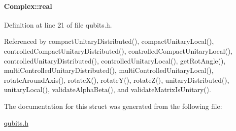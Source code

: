 \paragraph[{\texorpdfstring{real}{real}}]{ Complex\+::real}\hypertarget{structComplex_a479ad939835457595fcca3ca55c06283}{}\label{structComplex_a479ad939835457595fcca3ca55c06283}


Definition at line 21 of file qubits.\+h.



Referenced by compact\+Unitary\+Distributed(), compact\+Unitary\+Local(), controlled\+Compact\+Unitary\+Distributed(), controlled\+Compact\+Unitary\+Local(), controlled\+Unitary\+Distributed(), controlled\+Unitary\+Local(), get\+Rot\+Angle(), multi\+Controlled\+Unitary\+Distributed(), multi\+Controlled\+Unitary\+Local(), rotate\+Around\+Axis(), rotate\+X(), rotate\+Y(), rotate\+Z(), unitary\+Distributed(), unitary\+Local(), validate\+Alpha\+Beta(), and validate\+Matrix\+Is\+Unitary().



The documentation for this struct was generated from the following file\+:\begin{DoxyCompactItemize}
\item 
\hyperlink{qubits_8h}{qubits.\+h}\end{DoxyCompactItemize}
